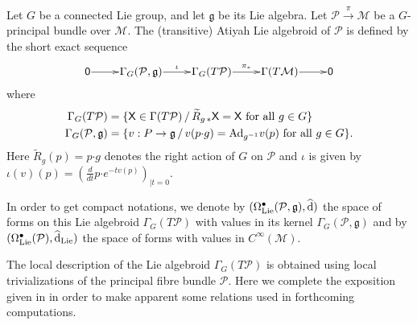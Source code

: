 \documentclass[number]{elsarticle}
\theoremstyle{definition}
\theoremstyle{remark}
\numberwithin{equation}{section}
\begin{document}
Let $G$ be a connected Lie group, and let ${{\mathfrak g}}$ be its Lie algebra. Let ${{{{\mathcal{{P}}}}}} \xrightarrow{\pi} {{{{\mathcal{{M}}}}}}$ be a $G$-principal bundle over ${{{{\mathcal{{M}}}}}}$. The (transitive) Atiyah Lie algebroid of ${{{{\mathcal{{P}}}}}}$ is defined by the short exact sequence
\begin{equation*}
\xymatrix@1{{{{{\mathsf{{0}}}}}} \ar[r] & {\Gamma_G({{{{\mathcal{{P}}}}}}, {{\mathfrak g}})} \ar[r]^-{\iota} & {\Gamma_G(T{{{{\mathcal{{P}}}}}})} \ar[r]^-{\pi_\ast} & {\Gamma(T {{{{\mathcal{{M}}}}}})} \ar[r] & {{{{\mathsf{{0}}}}}}}
\end{equation*}
where 
\begin{align*}
\Gamma_G(T{{{{\mathcal{{P}}}}}}) &= \{ {{\mathsf X}} \in \Gamma(T{{{{\mathcal{{P}}}}}}) \, / \, {{\widetilde{R}}}_{g\,\ast}{{\mathsf X}} = {{\mathsf X}} \text{ for all } g \in G \}
\\
\Gamma_G({{{{\mathcal{{P}}}}}}, {{\mathfrak g}}) &= \{ v : P \rightarrow {{\mathfrak g}} \, / \, v(p {\mathord{\cdot}} g) = {{\text{\textup{Ad}}}}_{g^{-1}} v(p) \text{ for all } g \in G \}.
\end{align*}
Here ${{\widetilde{R}}}_g(p) = p {\mathord{\cdot}} g$ denotes the right action of $G$ on ${{{{\mathcal{{P}}}}}}$ and $\iota$ is given by $\iota(v)(p) = \left( \frac{d}{dt} p {\mathord{\cdot}} e^{-t v(p)} \right)_{|t=0}$.

In order to get compact notations, we denote by $(\Omega^{\bullet}_{{\text{\textup{Lie}}}}({{{{\mathcal{{P}}}}}}, {{\mathfrak g}}), {\widehat{\text{\textup{d}}}})$ the space of forms on this Lie algebroid $\Gamma_G(T{{{{\mathcal{{P}}}}}})$ with values in its kernel $\Gamma_G({{{{\mathcal{{P}}}}}}, {{\mathfrak g}})$ and by $(\Omega^{\bullet}_{{\text{\textup{Lie}}}}({{{{\mathcal{{P}}}}}}), {\widehat{\text{\textup{d}}}}_{{\text{\textup{Lie}}}})$ the space of forms with values in $C^\infty({{{{\mathcal{{M}}}}}})$.

The local description of the Lie algebroid $\Gamma_G(T{{{{\mathcal{{P}}}}}})$ is obtained using local trivializations of the principal fibre bundle ${{{{\mathcal{{P}}}}}}$. Here we complete the exposition given in \cite{Mass38} in order to make apparent some relations used in forthcoming computations.
\end{document}
